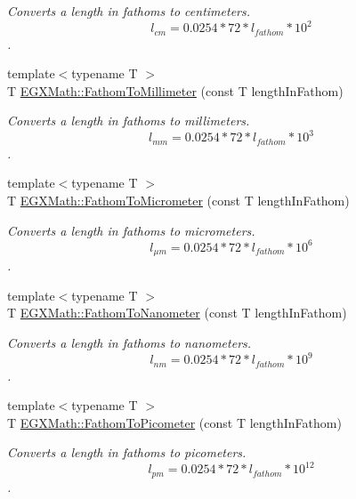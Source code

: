 \begin{DoxyCompactItemize}
\begin{DoxyCompactList}\small\item\em Converts a length in fathoms to centimeters. \[ l_{cm}=0.0254 * 72 * l_{fathom} * 10^{2} \]. \end{DoxyCompactList}\item 
{\footnotesize template$<$typename T $>$ }\\T \mbox{\hyperlink{group___e_g_x_math-_conversions-_length_conversions-_nautical-_fathom-_s_i_gaa9e44fa377dc5d69f70d3974311ec89d}{E\+G\+X\+Math\+::\+Fathom\+To\+Millimeter}} (const T length\+In\+Fathom)
\begin{DoxyCompactList}\small\item\em Converts a length in fathoms to millimeters. \[ l_{mm}=0.0254 * 72 * l_{fathom} * 10^{3} \]. \end{DoxyCompactList}\item 
{\footnotesize template$<$typename T $>$ }\\T \mbox{\hyperlink{group___e_g_x_math-_conversions-_length_conversions-_nautical-_fathom-_s_i_gabc04c2f094545c3ae8d4e493e4af417e}{E\+G\+X\+Math\+::\+Fathom\+To\+Micrometer}} (const T length\+In\+Fathom)
\begin{DoxyCompactList}\small\item\em Converts a length in fathoms to micrometers. \[ l_{\mu m}=0.0254 * 72 * l_{fathom} * 10^{6} \]. \end{DoxyCompactList}\item 
{\footnotesize template$<$typename T $>$ }\\T \mbox{\hyperlink{group___e_g_x_math-_conversions-_length_conversions-_nautical-_fathom-_s_i_gad31bafe9815ccaf4f06f429e3eb9c242}{E\+G\+X\+Math\+::\+Fathom\+To\+Nanometer}} (const T length\+In\+Fathom)
\begin{DoxyCompactList}\small\item\em Converts a length in fathoms to nanometers. \[ l_{nm}=0.0254 * 72 * l_{fathom} * 10^{9} \]. \end{DoxyCompactList}\item 
{\footnotesize template$<$typename T $>$ }\\T \mbox{\hyperlink{group___e_g_x_math-_conversions-_length_conversions-_nautical-_fathom-_s_i_gad5fe5d3a1a48420dc43cd2826a9b6f71}{E\+G\+X\+Math\+::\+Fathom\+To\+Picometer}} (const T length\+In\+Fathom)
\begin{DoxyCompactList}\small\item\em Converts a length in fathoms to picometers. \[ l_{pm}=0.0254 * 72 * l_{fathom} * 10^{12} \]. \end{DoxyCompactList}\item 

\end{DoxyCompactItemize}
